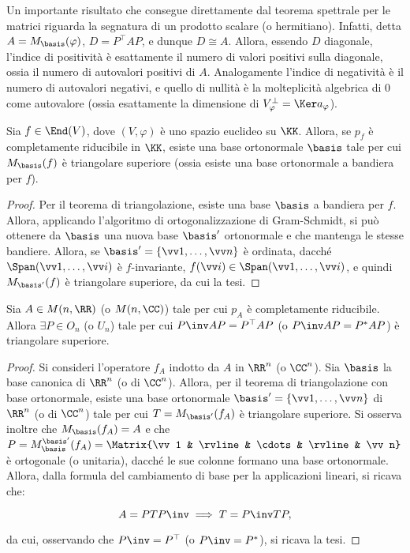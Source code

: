 \documentclass[11pt]{article}
\begin{document}
	\begin{remark}\nl
		\li Un importante risultato che consegue direttamente dal teorema spettrale per le matrici riguarda
		la segnatura di un prodotto scalare (o hermitiano). Infatti, detta $A = M_\basis(\varphi)$,
		$D = P^\top A P$, e dunque $D \cong A$. Allora, essendo $D$ diagonale, l'indice di positività
		è esattamente il numero di valori positivi sulla diagonale, ossia il numero di autovalori
		positivi di $A$. Analogamente l'indice di negatività è il numero di autovalori negativi,
		e quello di nullità è la molteplicità algebrica di $0$ come autovalore (ossia esattamente
		la dimensione di $V^\perp_\varphi = \Ker a_\varphi$).
	\end{remark}
	
	\begin{theorem} 
		Sia $f \in \End(V)$, dove $(V, \varphi)$ è uno spazio euclideo su $\KK$. Allora,
		se $p_f$ è completamente riducibile in $\KK$, esiste una base ortonormale $\basis$
		tale per cui $M_\basis(f)$ è triangolare superiore (ossia esiste una base ortonormale
		a bandiera per $f$).
	\end{theorem}
	
	\begin{proof}
		Per il teorema di triangolazione, esiste una base $\basis$ a bandiera per $f$. Allora,
		applicando l'algoritmo di ortogonalizzazione di Gram-Schmidt, si può ottenere da $\basis$
		una nuova base $\basis'$ ortonormale e che mantenga le stesse bandiere. Allora,
		se $\basis' = \{ \vv1, \ldots, \vv n \}$ è ordinata, dacché $\Span(\vv 1, \ldots, \vv i)$ è $f$-invariante,
		$f(\vv i) \in \Span(\vv 1, \ldots, \vv i)$, e quindi $M_{\basis'}(f)$ è triangolare superiore, da cui la tesi.
	\end{proof}
	
	\begin{corollary}
		Sia $A \in M(n, \RR)$ (o $M(n, \CC)$) tale per cui $p_A$ è completamente riducibile.
		Allora $\exists P \in O_n$ (o $U_n$) tale per cui
		$P\inv A P = P^\top A P$ (o $P\inv A P = P^* A P$) è triangolare superiore.
	\end{corollary}
	
	\begin{proof}
		Si consideri l'operatore $f_A$ indotto da $A$ in $\RR^n$ (o $\CC^n$). Sia $\basis$ la base canonica di $\RR^n$ (o di $\CC^n$). Allora, per il teorema
		di triangolazione con base ortonormale, esiste una base ortonormale $\basis' = \{ \vv1, \ldots, \vv n \}$ di $\RR^n$ (o di $\CC^n$)
		tale per cui $T = M_{\basis'}(f_A)$ è triangolare superiore. Si osserva inoltre che $M_{\basis}(f_A) = A$ e che $P = M_{\basis}^{\basis'} (f_A) = \Matrix{\vv 1 & \rvline & \cdots & \rvline & \vv n}$ è ortogonale (o unitaria), dacché le sue colonne
		formano una base ortonormale. Allora, dalla formula del cambiamento di base per la applicazioni lineari,
		si ricava che:
		
		\[ A = P T P\inv \implies T = P\inv T P, \]
		
		da cui, osservando che $P\inv = P^\top$ (o $P\inv = P^*$), si ricava la tesi.
	\end{proof}
	
\end{document}
